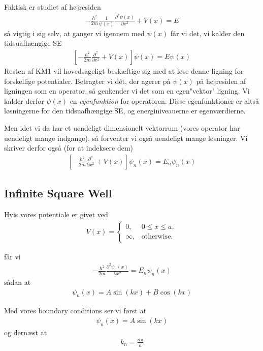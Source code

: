 Faktisk er studiet af højresiden \begin{align*}
    - \frac{\hbar ^{2} }{2m} \frac{1}{\psi (x)} \frac{\partial ^{2} \psi (x)}{\partial x ^{2} } + V(x) = E
\end{align*}
så vigtig i sig selv, at ganger vi igennem med \(\psi (x)\) får vi det, vi kalder den tidsuafhængige SE \begin{align*}
    \boxed{\left[ -\frac{\hbar ^{2} }{2m} \frac{\partial ^{2} }{\partial x ^{2} } + V(x) \right] \psi (x) = E \psi (x)}
\end{align*} 
Resten af KM1 vil hovedsageligt beskæftige sig med at løse denne ligning for forskellige potentialer. Betragter vi dét, der agerer på \(\psi (x)\) på højresiden af ligningen som en operator, så genkender vi det som en egen"vektor" ligning. Vi kalder derfor \(\psi (x)\) en \textit{egenfunktion} for operatoren. Disse egenfunktioner er altså løsningerne for den tidsuafhængige SE, og energiniveauerne er egenværdierne. 

Men idet vi da har et uendeligt-dimensionelt vektorrum (vores operator har uendeligt mange indgange), så forventer vi også uendeligt mange løsninger. Vi skriver derfor også (for at indeksere dem) \begin{align*}
    \left[ - \frac{\hbar ^{2} }{2m} \frac{\partial ^{2} }{\partial x ^{2} } + V(x)\right] \psi_n (x) = E_n \psi_n (x)
\end{align*}

\subsection{Infinite Square Well}
Hvis vores potentiale er givet ved
\begin{align*}
    V(x) = 
    \begin{cases}
    0, & 0 \le x \le a, \\
    \infty, & \text{otherwise}.
    \end{cases}
\end{align*}

får vi \begin{align*}
    - \frac{\hbar ^{2} }{2m} \frac{\partial ^{2} \psi_n (x)}{\partial x ^{2} } = E_n \psi _n (x)
\end{align*}
sådan at \begin{align*}
    \psi _n (x) = A \sin (kx) + B \cos (kx)
\end{align*}

Med vores boundary conditions ser vi først at \begin{align*}
    \psi_n(x) = A \sin (kx)
\end{align*}
og dernæst at \begin{align*}
    k_n = \frac{n \pi }{a} 
\end{align*}



